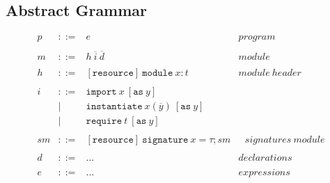 \documentclass{llncs}
\newcommand{\keywadj}[1]{\mathtt{#1}}
\newcommand{\keyw}[1]{\keywadj{#1}~}
\begin{document}
\newpage

\subsection{Abstract Grammar}
\[
\begin{array}{cllr}
p & ::= & e & program \\
&&\\
m & ::= & h~\overline{i}~\overline{d} & module \\
&&\\
h & ::= & [\keywadj{resource}]~\keyw{module} x : t & module~header \\
&&\\
i & ::= & \keyw{import} x~[\keyw{as} y] \\
  & |   & \keyw{instantiate} x(\overline{y})~[\keyw{as} y] \\
  & |   & \keyw{require} t~[\keyw{as} y]\\
&&\\
sm & ::= & [\keywadj{resource}]~\keyw{signature} x = \tau; sm &~~~signatures~module \\
&&\\
d & ::= & ... & declarations \\
&&\\
e & ::= & ... & expressions \\
&&\\
\end{array}
\]
\end{document}
